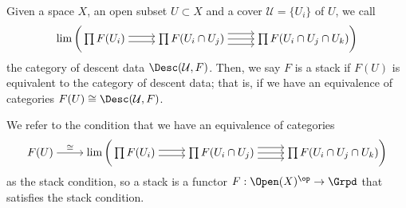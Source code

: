 \begin{definition}
Given a space $X$, an open subset $U \subset X$ and a cover $\mathcal{U} = \{U_i\}$ of $U$, we call 
\[\begin{tikzcd}[cramped]
	{\lim \bigg( \prod F(U_i)} & {\prod F(U_i \cap U_j)} & {\prod F(U_i \cap U_j \cap U_k) \bigg)}
	\arrow[shift right, from=1-1, to=1-2]
	\arrow[shift left, from=1-1, to=1-2]
	\arrow[from=1-2, to=1-3]
	\arrow[shift left=2, from=1-2, to=1-3]
	\arrow[shift right=2, from=1-2, to=1-3]
\end{tikzcd}\]
the category of descent data $\Desc(\mathcal{U}, F)$. Then, we say $F$ is a stack if $F(U)$ is equivalent to the category of descent data; that is, if we have an equivalence of categories $F(U) \cong \Desc(\mathcal{U}, F)$.
\end{definition}
\begin{definition}
We refer to the condition that we have an equivalence of categories
\[\begin{tikzcd}[cramped]
	{F(U)} & {\lim \bigg( \prod F(U_i)} & {\prod F(U_i \cap U_j)} & {\prod F(U_i \cap U_j \cap U_k) \bigg)}
	\arrow["\cong", from=1-1, to=1-2]
	\arrow[shift right, from=1-2, to=1-3]
	\arrow[shift left, from=1-2, to=1-3]
	\arrow[from=1-3, to=1-4]
	\arrow[shift left=2, from=1-3, to=1-4]
	\arrow[shift right=2, from=1-3, to=1-4]
\end{tikzcd}\]
as the stack condition, so a stack is a functor $F: \Open(X)^\op \to \Grpd$ that satisfies the stack condition.
\end{definition}

